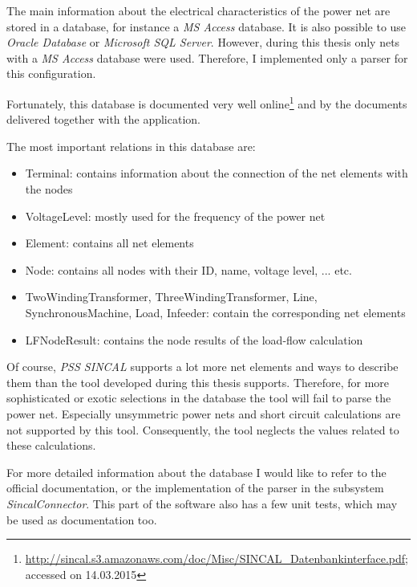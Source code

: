 The main information about the electrical characteristics of the power net are stored in a database, for instance a \emph{MS Access} database. It is also possible to use \emph{Oracle Database} or \emph{Microsoft SQL Server}. However, during this thesis only nets with a \emph{MS Access} database were used. Therefore, I implemented only a parser for this configuration.

Fortunately, this database is documented very well online\footnote{\url{http://sincal.s3.amazonaws.com/doc/Misc/SINCAL_Datenbankinterface.pdf}; accessed on 14.03.2015} and by the documents delivered together with the application.

The most important relations in this database are:
\begin{itemize}
	\item Terminal: contains information about the connection of the net elements with the nodes
	\item VoltageLevel: mostly used for the frequency of the power net
	\item Element: contains all net elements
	\item Node: contains all nodes with their ID, name, voltage level, ... etc.
	\item TwoWindingTransformer, ThreeWindingTransformer, Line, SynchronousMachine, Load, Infeeder: contain the corresponding net elements
	\item LFNodeResult: contains the node results of the load-flow calculation
\end{itemize}

Of course, \emph{PSS SINCAL} supports a lot more net elements and ways to describe them than the tool developed during this thesis supports. Therefore, for more sophisticated or exotic selections in the database the tool will fail to parse the power net. Especially unsymmetric power nets and short circuit calculations are not supported by this tool. Consequently, the tool neglects the values related to these calculations.

For more detailed information about the database I would like to refer to the official documentation, or the implementation of the parser in the subsystem \emph{SincalConnector}. This part of the software also has a few unit tests, which may be used as documentation too.